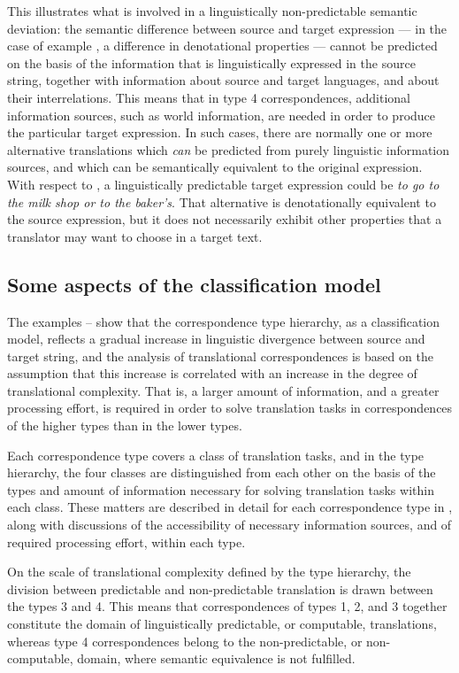 \documentclass[output=paper]{LSP/langsci}
\begin{document}
This illustrates what is involved in a linguistically non-predictable semantic deviation: the semantic difference between source and target expression — in the case of example , a difference in denotational properties — cannot be predicted on the basis of the information that is linguistically expressed in the source string, together with information about source and target languages, and about their interrelations. This means that in type 4 correspondences, additional information sources, such as world information, are needed in order to produce the particular target expression. In such cases, there are normally one or more alternative translations which \textit{can} be predicted from purely linguistic information sources, and which can be semantically equivalent to the original expression. With respect to , a linguistically predictable target expression could be \textit{to go to the milk shop or to the baker's}. That alternative is denotationally equivalent to the source expression, but it does not necessarily exhibit other properties that a translator may want to choose in a target text. 

\subsection{Some aspects of the classification model}\label{sec:thunes:3.2}

The examples -- show that the correspondence type hierarchy, as a classification model, reflects a gradual increase in linguistic divergence between source and target string, and the analysis of translational correspondences is based on the assumption that this increase is correlated with an increase in the degree of translational complexity. That is, a larger amount of information, and a greater processing effort, is required in order to solve translation tasks in correspondences of the higher types than in the lower types. 

Each correspondence type covers a class of translation tasks, and in the type hierarchy, the four classes are distinguished from each other on the basis of the types and amount of information necessary for solving translation tasks within each class. These matters are described in detail for each correspondence type in \citet{Thunes2011}, along with discussions of the accessibility of necessary information sources, and of required processing effort, within each type.

On the scale of translational complexity defined by the type hierarchy, the division between predictable and non-predictable translation is drawn between the types 3 and 4. This means that correspondences of types 1, 2, and 3 together constitute the domain of linguistically predictable, or computable, translations, whereas type 4 correspondences belong to the non-predictable, or non-computable, domain, where semantic equivalence is not fulfilled.
\end{document}
